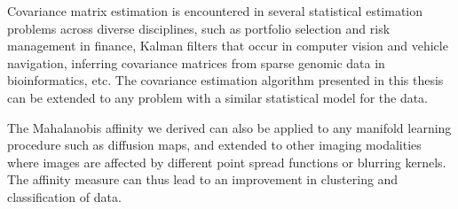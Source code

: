 Covariance matrix estimation is encountered in several statistical estimation problems across diverse disciplines, such as portfolio selection and risk management in finance, Kalman filters that occur in computer vision and vehicle navigation, inferring covariance matrices from sparse genomic data in bioinformatics, etc. The covariance estimation algorithm presented in this thesis can be extended to any problem with a similar statistical model for the data. 

The Mahalanobis affinity we derived can also be applied to any manifold learning procedure such as diffusion maps, and extended to other imaging modalities where images are affected by different point spread functions or blurring kernels. The affinity measure can thus lead to an improvement in clustering and classification of data.





